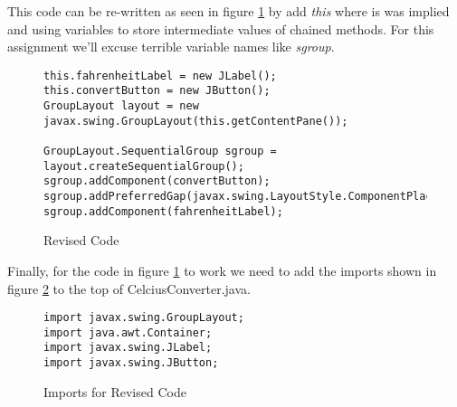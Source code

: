 \documentclass[]{tufte-handout}
\begin{document}
This code can be re-written as seen in figure \ref{revise} by add \textit{this} where is was implied and using variables to store intermediate values of chained methods. For this assignment we'll excuse terrible variable names like \textit{sgroup}.
\begin{figure}[ht]
\begin{lstlisting}
this.fahrenheitLabel = new JLabel();
this.convertButton = new JButton();
GroupLayout layout = new javax.swing.GroupLayout(this.getContentPane());

GroupLayout.SequentialGroup sgroup = layout.createSequentialGroup();
sgroup.addComponent(convertButton);
sgroup.addPreferredGap(javax.swing.LayoutStyle.ComponentPlacement.RELATED);
sgroup.addComponent(fahrenheitLabel);
\end{lstlisting}
\label{revise}
\caption{Revised Code}
\end{figure}


Finally, for the code in figure \ref{revise} to work we need to add the imports shown in figure \ref{ports} to the top of CelciusConverter.java. 
\begin{figure}[ht]
\begin{lstlisting}
import javax.swing.GroupLayout;
import java.awt.Container;
import javax.swing.JLabel;
import javax.swing.JButton;
\end{lstlisting}
\label{ports}
\caption{Imports for Revised Code}
\end{figure}
\end{document}
